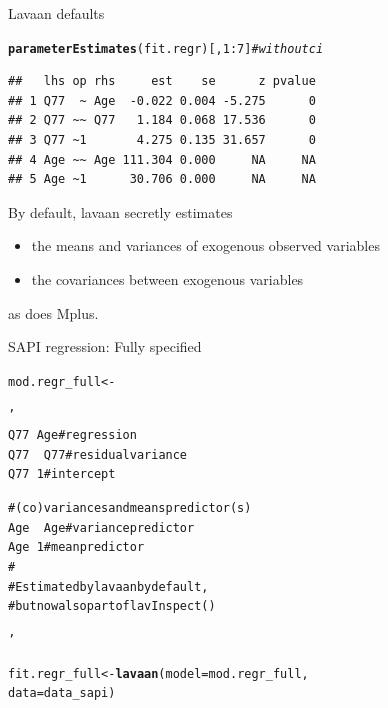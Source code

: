 \documentclass[10pt]{beamer}\usepackage[]{graphicx}\usepackage[]{xcolor}
\makeatletter
\newcommand{\hlnum}[1]{\textcolor[rgb]{0.686,0.059,0.569}{#1}}%
\newcommand{\hlstr}[1]{\textcolor[rgb]{0.192,0.494,0.8}{#1}}%
\newcommand{\hlcom}[1]{\textcolor[rgb]{0.678,0.584,0.686}{\textit{#1}}}%
\newcommand{\hlopt}[1]{\textcolor[rgb]{0,0,0}{#1}}%
\newcommand{\hlstd}[1]{\textcolor[rgb]{0.345,0.345,0.345}{#1}}%
\newcommand{\hlkwb}[1]{\textcolor[rgb]{0.69,0.353,0.396}{#1}}%
\newcommand{\hlkwc}[1]{\textcolor[rgb]{0.333,0.667,0.333}{#1}}%
\newcommand{\hlkwd}[1]{\textcolor[rgb]{0.737,0.353,0.396}{\textbf{#1}}}%
\newenvironment{kframe}{%
 \def\at@end@of@kframe{}%
 \ifinner\ifhmode%
  \def\at@end@of@kframe{\end{minipage}}%
  \begin{minipage}{\columnwidth}%
 \fi\fi%
 \def\FrameCommand##1{\hskip\@totalleftmargin \hskip-\fboxsep
 \colorbox{shadecolor}{##1}\hskip-\fboxsep
     \hskip-\linewidth \hskip-\@totalleftmargin \hskip\columnwidth}%
 \MakeFramed {\advance\hsize-\width
   \@totalleftmargin\z@ \linewidth\hsize
   \@setminipage}}%
 {\par\unskip\endMakeFramed%
 \at@end@of@kframe}
\newenvironment{knitrout}{}{} %
\makeatother
\begin{document}
%
\begin{frame}[fragile]{Lavaan defaults}

\begin{knitrout}
\color{fgcolor}\begin{kframe}
\begin{alltt}
\hlkwd{parameterEstimates}\hlstd{(fit.regr)[,}\hlnum{1}\hlopt{:}\hlnum{7}\hlstd{]} \hlcom{# without ci}
\end{alltt}
\begin{verbatim}
##   lhs op rhs     est    se      z pvalue
## 1 Q77  ~ Age  -0.022 0.004 -5.275      0
## 2 Q77 ~~ Q77   1.184 0.068 17.536      0
## 3 Q77 ~1       4.275 0.135 31.657      0
## 4 Age ~~ Age 111.304 0.000     NA     NA
## 5 Age ~1      30.706 0.000     NA     NA
\end{verbatim}
\end{kframe}
\end{knitrout}

By default, lavaan secretly estimates
\begin{itemize}
  \item the means and variances of exogenous observed variables
  \item the covariances between exogenous variables
\end{itemize}
as does Mplus.

\end{frame}
%
\begin{frame}[fragile]{SAPI regression: Fully specified}

\begin{knitrout}
\color{fgcolor}\begin{kframe}
\begin{alltt}
\hlstd{mod.regr_full} \hlkwb{<-} \hlstr{'
  Q77 ~  Age # regression
  Q77 ~~ Q77 # residual variance
  Q77 ~  1   # intercept
  
  # (co)variances and means predictor(s)
  Age ~~ Age # variance predictor
  Age ~ 1    # mean predictor
  #
  # Estimated by lavaan by default, 
  # but now also part of lavInspect()
  
'}
\hlstd{fit.regr_full} \hlkwb{<-} \hlkwd{lavaan}\hlstd{(}\hlkwc{model} \hlstd{= mod.regr_full,}
                         \hlkwc{data} \hlstd{= data_sapi)}
\end{alltt}
\end{kframe}
\end{knitrout}

\end{frame}
\end{document}
